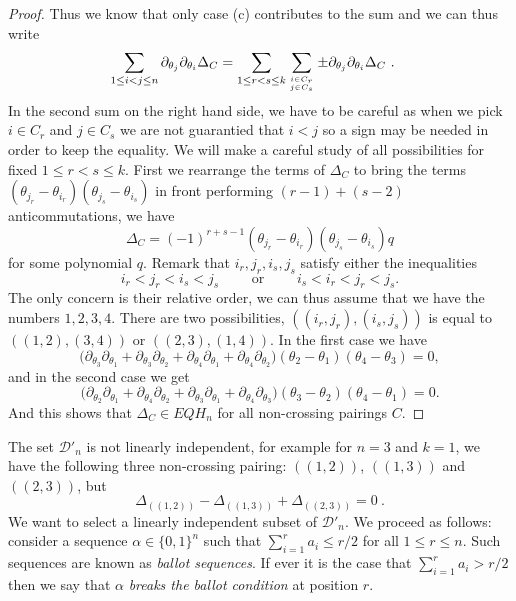 \documentclass[11pt]{amsart}
\newcommand{\defncolor}{\color{darkred}}
\newcommand{\defn}[1]{{\defncolor\emph{#1}}} %
\theoremstyle{definition}
\numberwithin{equation}{section}
\begin{document}
\begin{proof}
Thus we know that only case (c) contributes to the sum and we can thus write
\begin{align*}
 \sum_{1\le i<j\le n} \partial_{\theta_j}\partial_{\theta_i}\Delta_C
 &= \sum_{1\le r<s\le k} \sum_{i\in C_{r} \atop j\in C_{s}} \pm  \partial_{\theta_j}\partial_{\theta_i}\Delta_C~.
\end{align*}
In the second sum on the right hand side, we have to be careful as when we pick $i\in C_{r}$ and $ j\in C_{s}$ we are not guarantied that $i<j$ so a sign may be needed 
in  order to keep the equality. We will make a careful study of all possibilities for fixed $1\le r<s\le k$. First we rearrange the terms of $\Delta_C$ to  bring the terms 
$(\theta_{j_{r}}-\theta_{i_{r}})(\theta_{j_{s}}-\theta_{i_{s}})$ in front  performing $(r-1)+(s-2)$ anticommutations, we have 
  $$\Delta_C  =(-1)^{r+s-1}(\theta_{j_{r}}-\theta_{i_{r}})(\theta_{j_{s}}-\theta_{i_{s}})q$$
  for some polynomial $q$. Remark that $i_{r},j_{r},i_{s},j_{s}$ satisfy either the inequalities
  $$  i_r<j_r<i_s<j_s \qquad \text{ or }\qquad  i_s<i_r<j_r<j_s.$$
 The only concern is their relative order, we can thus assume that we have the numbers $1,2,3,4$.
  There are two possibilities, $((i_r,j_r), (i_s,j_s))$ is equal to $((1,2),(3,4))$ or $((2,3),(1,4))$.
  In the first case we have
$$ \big( \partial_{\theta_3}\partial_{\theta_1} +  \partial_{\theta_3}\partial_{\theta_2} +  \partial_{\theta_4}\partial_{\theta_1} +  \partial_{\theta_4}\partial_{\theta_2}\big)
     (\theta_{2}-\theta_{1})(\theta_{4}-\theta_{3}) =0,
$$  
 and in the second case we get 
$$ \big( \partial_{\theta_2}\partial_{\theta_1} +  \partial_{\theta_4}\partial_{\theta_2} +  \partial_{\theta_3}\partial_{\theta_1} +  \partial_{\theta_4}\partial_{\theta_3}\big)
     (\theta_{3}-\theta_{2})(\theta_{4}-\theta_{1}) =0.
$$  
And this shows that $\Delta_C\in EQH_n $ for all non-crossing pairings $C$.
\end{proof}

The set ${\mathcal D}'_n$ is not linearly independent, for example for $n=3$ and $k=1$, we have the following three non-crossing pairing:
$((1,2))$, $((1,3))$ and $((2,3))$, but
\[
\Delta_{((1,2))} - \Delta_{((1,3))} + \Delta_{((2,3))} =0 ~.
\]
We want to select a linearly independent subset of ${\mathcal D}'_n$. We proceed as follows:
consider a sequence
$\alpha \in \{0, 1\}^n$ such that $\sum_{i=1}^r a_i \leq r/2$ for all $1 \leq r \leq n$. 
Such sequences are known as \defn{ballot sequences}.
If ever it is the case that $\sum_{i=1}^r a_i > r/2$ then we say that
$\alpha$ \defn{breaks the ballot condition} at position $r$.
\end{document}
